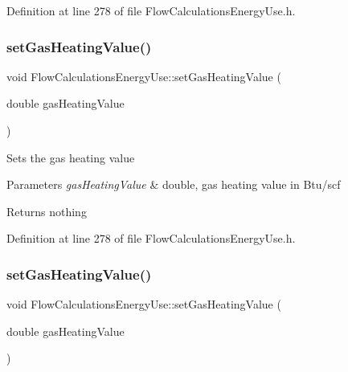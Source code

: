 Definition at line 278 of file Flow\+Calculations\+Energy\+Use.\+h.

\mbox{\label{class_flow_calculations_energy_use_ae51a954fb1f44d6b114f66e69bdf754e}} 
\subsubsection{\texorpdfstring{set\+Gas\+Heating\+Value()}{setGasHeatingValue()}\hspace{0.1cm}{\footnotesize\ttfamily [2/3]}}
{\footnotesize\ttfamily void Flow\+Calculations\+Energy\+Use\+::set\+Gas\+Heating\+Value (\begin{DoxyParamCaption}\item[{double}]{gas\+Heating\+Value }\end{DoxyParamCaption})\hspace{0.3cm}{\ttfamily [inline]}}

Sets the gas heating value


\begin{DoxyParams}{Parameters}
{\em gas\+Heating\+Value} & double, gas heating value in Btu/scf\\
\hline
\end{DoxyParams}
\begin{DoxyReturn}{Returns}
nothing 
\end{DoxyReturn}


Definition at line 278 of file Flow\+Calculations\+Energy\+Use.\+h.

\mbox{\label{class_flow_calculations_energy_use_ae51a954fb1f44d6b114f66e69bdf754e}} 
\subsubsection{\texorpdfstring{set\+Gas\+Heating\+Value()}{setGasHeatingValue()}\hspace{0.1cm}{\footnotesize\ttfamily [3/3]}}
{\footnotesize\ttfamily void Flow\+Calculations\+Energy\+Use\+::set\+Gas\+Heating\+Value (\begin{DoxyParamCaption}\item[{double}]{gas\+Heating\+Value }\end{DoxyParamCaption})\hspace{0.3cm}{\ttfamily [inline]}}

